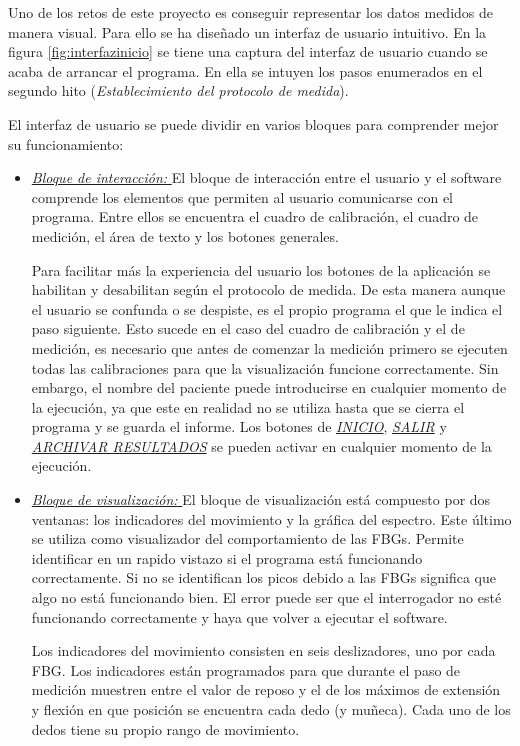 \begin{itemize} [label=]
	Uno de los retos de este proyecto es conseguir representar los datos medidos de manera visual. Para ello se ha diseñado un interfaz de usuario intuitivo. En la figura \ref{fig:interfazinicio} se tiene una captura del interfaz de usuario cuando se acaba de arrancar el programa. En ella se intuyen los pasos enumerados en el segundo hito (\textit{Establecimiento del protocolo de medida}).
	
	El interfaz de usuario se puede dividir en varios bloques para comprender mejor su funcionamiento:
	
	\begin{itemize} [label=]
		\item \underline{\textit{Bloque de interacción: }} El bloque de interacción entre el usuario y el software comprende los elementos que permiten al usuario comunicarse con el programa. Entre ellos se encuentra el cuadro de calibración, el cuadro de medición, el área de texto y los botones generales. 
		
		Para facilitar más la experiencia del usuario los botones de la aplicación se habilitan y desabilitan según el protocolo de medida. De esta manera aunque el usuario se confunda o se despiste, es el propio programa el que le indica el paso siguiente. Esto sucede en el caso del cuadro de calibración y el de medición, es necesario que antes de comenzar la medición primero se ejecuten todas las calibraciones para que la visualización funcione correctamente. Sin embargo, el nombre del paciente puede introducirse en cualquier momento de la ejecución, ya que este en realidad no se utiliza hasta que se cierra el programa y se guarda el informe. Los botones de \underline{\textit{INICIO}}, \underline{\textit{SALIR}} y \underline{\textit{ARCHIVAR RESULTADOS}} se pueden activar en cualquier momento de la ejecución.
		
		\item \underline{\textit{Bloque de visualización: }} El bloque de visualización está compuesto por dos ventanas: los indicadores del movimiento y la gráfica del espectro. Este último se utiliza como visualizador del comportamiento de las FBGs. Permite identificar en un rapido vistazo si el programa está funcionando correctamente. Si no se identifican los picos debido a las FBGs significa que algo no está funcionando bien. El error puede ser que el interrogador no esté funcionando correctamente y haya que volver a ejecutar el software. 
		
		Los indicadores del movimiento consisten en seis deslizadores, uno por cada FBG. Los indicadores están programados para que durante el paso de medición muestren entre el valor de reposo y el de los máximos de extensión y flexión en que posición se encuentra cada dedo (y muñeca). Cada uno de los dedos tiene su propio rango de movimiento.  
		

\end{itemize}
\end{itemize}
